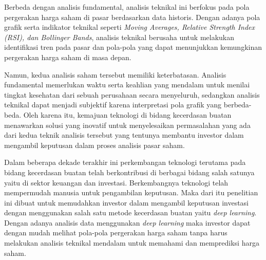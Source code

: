 Berbeda dengan analisis fundamental, analisis teknikal ini berfokus pada pola pergerakan harga saham di pasar berdasarkan data historis. Dengan adanya pola grafik serta indikator teknikal seperti \textit{Moving Averages, Relative Strength Index (RSI), dan Bollinger Bands}, analisis teknikal berusaha untuk melakukan identifikasi tren pada pasar dan pola-pola yang dapat menunjukkan kemungkinan pergerakan harga saham di masa depan.

Namun, kedua analisis saham tersebut memiliki keterbatasan. Analisis fundamental memerlukan waktu serta keahlian yang mendalam untuk menilai tingkat kesehatan dari sebuah perusahaan secara menyeluruh, sedangkan analisis teknikal dapat menjadi subjektif karena interpretasi pola grafik yang berbeda-beda. Oleh karena itu, kemajuan teknologi di bidang kecerdasan buatan menawarkan solusi yang inovatif untuk menyelesaikan permasalahan yang ada dari kedua teknik analisis tersebut yang tentunya membantu investor dalam mengambil keputusan dalam proses analisis pasar saham.

Dalam beberapa dekade terakhir ini perkembangan teknologi terutama pada bidang kecerdasan buatan telah berkontribusi di berbagai bidang salah satunya yaitu di sektor keuangan dan investasi. Berkembangnya teknologi telah mempermudah manusia untuk pengambilan keputusan. Maka dari itu penelitian ini dibuat untuk memudahkan investor dalam mengambil keputusan investasi dengan menggunakan salah satu metode kecerdasan buatan yaitu \textit{deep learning}. Dengan adanya analisis data menggunakan \textit{deep learning} maka investor dapat dengan mudah melihat pola-pola pergerakan harga saham tanpa harus melakukan analisis teknikal mendalam untuk memahami dan memprediksi harga saham.

